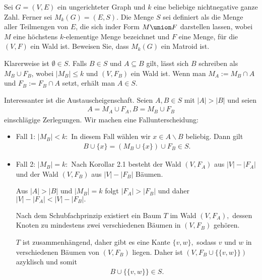 
\begin{exercise}

Sei $G = (V, E)$ ein ungerichteter Graph und $k$ eine beliebige nichtnegative ganze Zahl. Ferner sei $M_k(G) = (E, S)$. Die Menge $S$ sei definiert als die Menge aller Teilmengen von $E$, die sich inder Form $M \union F$ darstellen lassen, wobei $M$ eine höchstens $k$-elementige Menge bezeichnet und $F$ eine Menge, für die $(V, F)$ ein Wald ist. Beweisen Sie, dass $M_k(G)$ ein Matroid ist.

\end{exercise}


\begin{solution}

  Klarerweise ist $\emptyset \in S.$ Falls $B \in S$ und $A \subseteq B$ gilt, lässt sich $B$ schreiben als $M_B \cup F_B$, wobei $|M_B| \leq k$ und $(V, F_B)$ ein Wald ist. Wenn man $M_A := M_B \cap A$ und $F_B := F_B \cap A$ setzt, erhält man $A \in S$.

  Interessanter ist die Austauscheigenschaft. Seien $A, B \in S$ mit $|A| > |B|$ und seien
  \begin{align*}
      A = M_A \cup F_A, B = M_B \cup F_B
  \end{align*}
  einschlägige Zerlegungen.
  Wir machen eine Fallunterscheidung:
  \begin{itemize}
      \item Fall 1: $|M_B| < k:$ In diesem Fall wählen wir $x \in A\backslash B$ beliebig. Dann gilt
      \begin{align*}
      B \cup \{x\} = (M_B \cup \{x\}) \cup F_B \in S.
      \end{align*}
      \item Fall 2: $|M_B| = k:$ Nach Korollar 2.1 besteht der Wald $(V, F_A)$ aus $|V| - |F_A|$ und der Wald $(V, F_B)$ aus $|V| - |F_B|$ Bäumen.

      Aus $|A| > |B|$ und $|M_B| = k$ folgt $|F_A| > |F_B|$ und daher $|V| - |F_A| < |V| - |F_B|.$

      Nach dem Schubfachprinzip existiert ein Baum $T$ im Wald $(V, F_A),$ dessen Knoten zu mindestens zwei verschiedenen Bäumen in $(V, F_B)$ gehören.

      $T$ ist zusammenhängend, daher gibt es eine Kante $\{v, w\},$ sodass $v$ und $w$ in verschiedenen Bäumen von $(V, F_B)$ liegen. Daher ist $(V, F_B \cup \{\{v, w\}\})$ azyklisch und somit
      \begin{align*}
          B \cup \{\{v, w\}\} \in S.
      \end{align*}
  \end{itemize}
\end{solution}

